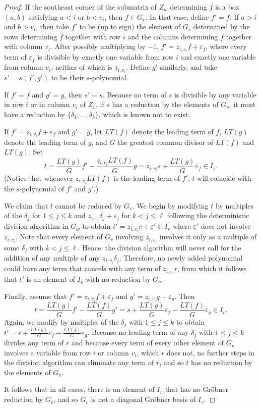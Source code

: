 \documentclass[ALCO,Unicode,published]{cedram}
\begin{document}
\begin{proof}
If the southeast corner of the submatrix of $Z_w$ determining $f$ is a box $(a,b)$ satisfying $a<i$ or $b<v_i$, then $f \in G_v$.  In that case, define $f' = f$.  If $a>i$ and $b>v_i$, then take $f'$ to be (up to sign) the element of $G_v$ determined by the rows determining $f$ together with row $i$ and the columns determining $f$ together with column $v_i$.  After possibly multiplying by $-1$, $f' = z_{i,v_i}f+\varepsilon_f$, where every term of $\varepsilon_f$ is divisible by exactly one variable from row $i$ and exactly one variable from column $v_i$, neither of which is $z_{i,v_i}$.  Define $g'$ similarly, and take $s' = s(f',g')$ to be their $s$-polynomial.  

If $f' = f$ and $g' = g$, then $s' = s$.  Because no term of $s$ is divisible by any variable in row $i$ or in column $v_i$ of $Z_v$, if $s$ has a reduction by the elements of $G_v$, it must have a reduction by $\{\delta_1, \ldots, \delta_k\}$, which is known not to exist.  

If $f' = z_{i,v_i}f+\varepsilon_f$ and $g' = g$, let $LT(f)$ denote the leading term of $f$, $LT(g)$ denote the leading term of $g$, and $G$ the greatest common divisor of $LT(f)$ and $LT(g)$.  Set \[
t = \frac{LT(g)}{G}f'-\frac{z_{i,v_i}LT(f)}{G}g = z_{i,v_i}s+\frac{LT(g)}{G}\varepsilon_f \in I_v.
\]  (Notice that whenever $z_{i,v_i}LT(f)$ is the leading term of $f'$, $t$ will coincide with the $s$-polynomial of $f'$ and $g'$.)  

We claim that $t$ cannot be reduced by $G_v$.  We begin by modifying $t$ by multiples of the $\delta_j$ for $1 \leq j \leq k$ and $z_{i,v_i}\delta_{j}+\varepsilon_{j}$ for $k<j \leq \ell$ following the deterministic division algorithm in $G_w$ to obtain $t' = z_{i,v_i}r+\varepsilon' \in I_v$ where $\varepsilon'$ does not involve $z_{i,v_i}$.  Note that every element of $G_v$ involving $z_{i,v_i}$ involves it only as a multiple of some $\delta_j$ with $k<j\leq \ell$.  Hence, the division algorithm will never call for the addition of any multiple of any $z_{i,v_i}\delta_j$.  Therefore, no newly added polynomial could have any term that cancels with any term of $z_{i,v_i}r$, from which it follows that $t'$ is an element of $I_v$ with no reduction by $G_v$.  

Finally, assume that $f' = z_{i,v_i}f+\varepsilon_f$ and $g' = z_{i,v_i}g+\varepsilon_g$.  Then \[
t = \frac{LT(g)}{G}f'-\frac{LT(f)}{G}g' = s+\frac{LT(g)}{G}\varepsilon_f-\frac{LT(f)}{G}\varepsilon_g \in I_v.
\] Again, we modify by multiples of the $\delta_j$ with $1 \leq j \leq k$ to obtain $t' = r+\frac{LT(g)}{G}\varepsilon_f-\frac{LT(f)}{G}\varepsilon_g$.  Because no leading term of any $\delta_j$ with $1 \leq j \leq k$ divides any term of $r$ and because every term of every other element of $G_v$ involves a variable from row $i$ or column $v_i$, which $r$ does not, no further steps in the division algorithm can eliminate any term of $r$, and so $t$ has no reduction by the elements of $G_v$.  

It follows that in all cases, there is an element of $I_v$ that has no Gr\"obner reduction by $G_v$, and so $G_v$ is not a diagonal Gr\"obner basis of $I_v$.
\end{proof}
\end{document}
